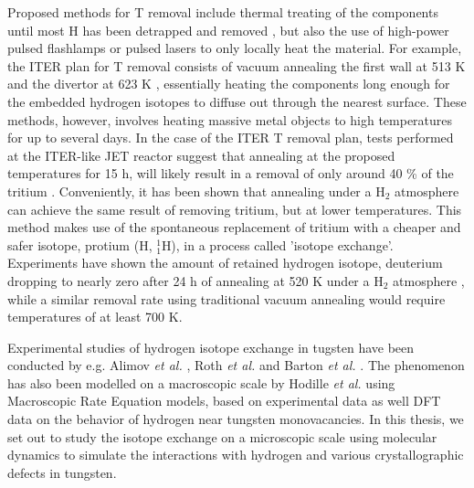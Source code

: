 Proposed methods for T removal include thermal treating of the components until most H has been detrapped and removed \cite{heinola2017long}, but also the use of high-power pulsed flashlamps \cite{gibson2005removal} or pulsed lasers \cite{skinner2008recent,de2017efficiency} to only locally heat the material. 
For example, the ITER plan for T removal consists of vacuum annealing the first wall at 513 K and the divertor at 623 K \cite{pitts2011physics}, essentially heating the components long enough for the embedded hydrogen isotopes to diffuse out through the nearest surface.
These methods, however, involves heating massive metal objects to high temperatures for up to several days. 
In the case of the ITER T removal plan, tests performed at the ITER-like JET reactor suggest that annealing at the proposed temperatures for 15 h, will likely result in a removal of only around 40 \% of the tritium \cite{heinola2017long}. 
Conveniently, it has been shown that annealing under a H$_2$ atmosphere can achieve the same result of removing tritium, but at lower temperatures. 
This method makes use of the spontaneous replacement of tritium with a cheaper and safer isotope, protium (H, $^1_1$H), in a process called 'isotope exchange'. Experiments have shown the amount of retained hydrogen isotope, deuterium dropping to nearly zero after 24 h of annealing at 520 K under a H$_2$ atmosphere \cite{ahlgren2019hydrogen}, while a similar removal rate using traditional vacuum annealing would require temperatures of at least 700 K.

Experimental studies of hydrogen isotope exchange in tugsten have been conducted by e.g. Alimov \textit{et al.} \cite{alimov2011hydrogen}, Roth \textit{et al.}  \cite{roth2013hydrogen} and Barton \textit{et al.} \cite{barton2014deuterium}. 
The phenomenon has also been modelled on a macroscopic scale by Hodille \textit{et al.} \cite{hodille2016study} using Macroscopic Rate Equation models, based on experimental data as well DFT data on the behavior of hydrogen near tungsten monovacancies. 
In this thesis, we set out to study the isotope exchange on a microscopic scale using molecular dynamics to simulate the interactions with hydrogen and various crystallographic defects in tungsten.
